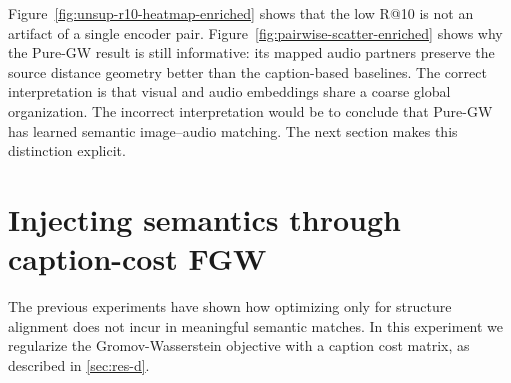 Figure~\ref{fig:unsup-r10-heatmap-enriched} shows that the low R@10 is not an artifact of a single encoder pair. Figure~\ref{fig:pairwise-scatter-enriched} shows why the Pure-GW result is still informative: its mapped audio partners preserve the source distance geometry better than the caption-based baselines. The correct interpretation is that visual and audio embeddings share a coarse global organization. The incorrect interpretation would be to conclude that Pure-GW has learned semantic image--audio matching. The next section makes this distinction explicit.

\section{Injecting semantics through caption-cost FGW}
\label{sec:results-caption-cost}

The previous experiments have shown how optimizing only for structure alignment does not incur in meaningful semantic matches.
In this experiment we regularize the Gromov-Wasserstein objective with a caption cost matrix, as described in \ref{sec:res-d}.  

